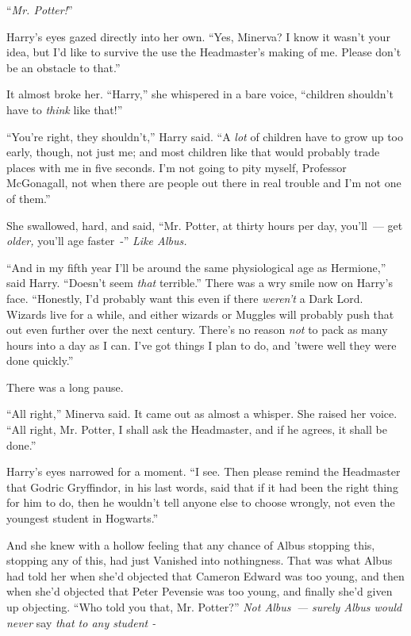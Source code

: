 ``\emph{Mr. Potter!}''

Harry's eyes gazed directly into her own. ``Yes, Minerva? I know it wasn't your idea, but I'd like to survive the use the Headmaster's making of me. Please don't be an obstacle to that.''

It almost broke her. ``Harry,'' she whispered in a bare voice, ``children shouldn't have to \emph{think} like that!''

``You're right, they shouldn't,'' Harry said. ``A \emph{lot} of children have to grow up too early, though, not just me; and most children like that would probably trade places with me in five seconds. I'm not going to pity myself, Professor McGonagall, not when there are people out there in real trouble and I'm not one of them.''

She swallowed, hard, and said, ``Mr. Potter, at thirty hours per day, you'll~--- get \emph{older,} you'll age faster~-'' \emph{Like Albus.}

``And in my fifth year I'll be around the same physiological age as Hermione,'' said Harry. ``Doesn't seem \emph{that} terrible.'' There was a wry smile now on Harry's face. ``Honestly, I'd probably want this even if there \emph{weren't} a Dark Lord. Wizards live for a while, and either wizards or Muggles will probably push that out even further over the next century. There's no reason \emph{not} to pack as many hours into a day as I can. I've got things I plan to do, and 'twere well they were done quickly.''

There was a long pause.

``All right,'' Minerva said. It came out as almost a whisper. She raised her voice. ``All right, Mr. Potter, I shall ask the Headmaster, and if he agrees, it shall be done.''

Harry's eyes narrowed for a moment. ``I see. Then please remind the Headmaster that Godric Gryffindor, in his last words, said that if it had been the right thing for him to do, then he wouldn't tell anyone else to choose wrongly, not even the youngest student in Hogwarts.''

And she knew with a hollow feeling that any chance of Albus stopping this, stopping any of this, had just Vanished into nothingness. That was what Albus had told her when she'd objected that Cameron Edward was too young, and then when she'd objected that Peter Pevensie was too young, and finally she'd given up objecting. ``Who told you that, Mr. Potter?'' \emph{Not Albus~--- surely Albus would never} say \emph{that to any student -}

